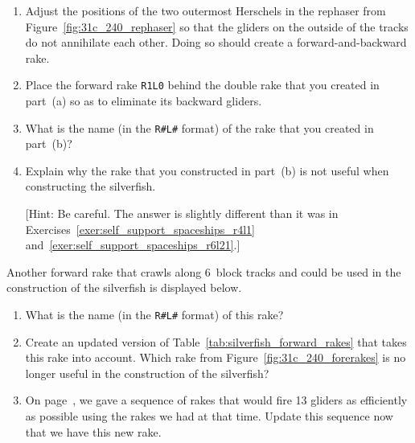 \begin{multicols}{2}
\begin{problemstar}
		\begin{enumerate}[label=\bf\color{ocre}(\alph*)]
			\item Adjust the positions of the two outermost Herschels in the rephaser from Figure~\ref{fig:31c_240_rephaser} so that the gliders on the outside of the tracks do not annihilate each other. Doing so should create a forward-and-backward rake.
			
			\item Place the forward rake \texttt{R1L0} behind the double rake that you created in part~(a) so as to eliminate its backward gliders.
			
			\item What is the name (in the \texttt{R\#L\#} format) of the rake that you created in part~(b)?
			
			\item Explain why the rake that you constructed in part~(b) is not useful when constructing the silverfish.
			
			[Hint: Be careful. The answer is slightly different than it was in Exercises~\ref{exer:self_support_spaceships_r4l1} and~\ref{exer:self_support_spaceships_r6l21}.]
		\end{enumerate}
	\end{problemstar}
	
	
	
	\mfilbreak
	
	
	\begin{problem}\label{exer:self_support_spaceships_r3l28}
		Another forward rake that crawls along $6$~block tracks and could be used in the construction of the silverfish is displayed below.
		\begin{center}
		\end{center}
		
		\begin{enumerate}[label=\bf\color{ocre}(\alph*)]
			\item {} What is the name (in the \texttt{R\#L\#} format) of this rake?
			
			\item {} Create an updated version of Table~\ref{tab:silverfish_forward_rakes} that takes this rake into account. Which rake from Figure~\ref{fig:31c_240_forerakes} is no longer useful in the construction of the silverfish?
			
			\item {} On page~\pageref{page:silverfish_rake_seq}, we gave a sequence of rakes that would fire 13 gliders as efficiently as possible using the rakes we had at that time. Update this sequence now that we have this new rake.
			

\end{enumerate}
\end{problem}
\end{multicols}
